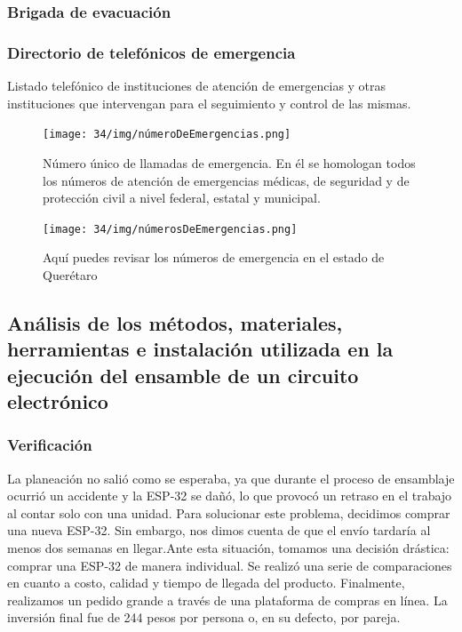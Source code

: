     \subsubsection{Brigada de evacuación}
    
    \subsubsection{Directorio de telefónicos de emergencia}
    
    Listado telefónico de instituciones de atención de emergencias y otras instituciones que intervengan para el seguimiento y control de las mismas.
    
    \begin{figure}[H]
        \centering
        \texttt{[image: 34/img/númeroDeEmergencias.png]}
        \caption{Número único de llamadas de emergencia. En él se homologan todos los números de atención de emergencias médicas, de seguridad y de protección civil a nivel federal, estatal y municipal.}
        \label{fig:númeroDeEmergencias}
    \end{figure}
    
    \begin{figure}[H]
        \centering
        \texttt{[image: 34/img/númerosDeEmergencias.png]}
        \caption{Aquí puedes revisar los números de emergencia en el estado de Querétaro}
        \label{fig:númerosDeEmergencias}
    \end{figure}
    
    \subsection{Análisis de los métodos, materiales, herramientas e instalación utilizada en la ejecución del ensamble de un circuito electrónico}
    
    \subsubsection{Verificación}
    
    La planeación no salió como se esperaba, ya que durante el proceso de ensamblaje ocurrió un accidente y la ESP-32 se dañó, lo que provocó un retraso en el trabajo al contar solo con una unidad. Para solucionar este problema, decidimos comprar una nueva ESP-32. Sin embargo, nos dimos cuenta de que el envío tardaría al menos dos semanas en llegar.Ante esta situación, tomamos una decisión drástica: comprar una ESP-32 de manera individual. Se realizó una serie de comparaciones en cuanto a costo, calidad y tiempo de llegada del producto. Finalmente, realizamos un pedido grande a través de una plataforma de compras en línea. La inversión final fue de 244 pesos por persona o, en su defecto, por pareja.
